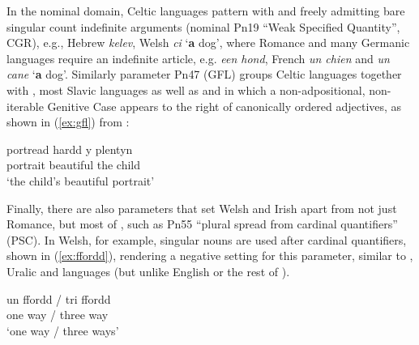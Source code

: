 \documentclass[output=paper,colorlinks,citecolor=brown]{langscibook}
\begin{document}
In the nominal domain, Celtic languages pattern with  and  freely admitting bare singular count indefinite arguments (nominal Pn19 ``Weak Specified Quantity'', CGR), e.g., Hebrew \textit{kelev}, Welsh \textit{ci} `\textbf{a} dog', where Romance and many Germanic languages require an indefinite article, e.g.   \textit{een hond}, French \textit{un chien} and  \textit{un cane} `\textbf{a} dog'. Similarly parameter Pn47 (GFL) groups Celtic languages together with , most Slavic languages as well as  and  in which a non-adpositional, non-iterable Genitive Case appears to the right of canonically ordered adjectives, as shown in (\ref{ex:gfl}) from  \citet[31]{mm:ceolin_at_2021}:

\ea
\settowidth{}
\gll portread hardd y plentyn\\
portrait beautiful the child\\ 
\glt `the child's beautiful portrait' 
\label{ex:gfl}
\z 

\noindent Finally, there are also parameters that set Welsh and Irish apart from not just Romance, but most of , such as Pn55 ``plural spread from cardinal quantifiers'' (PSC). In Welsh, for example, singular nouns are used after cardinal quantifiers, shown in (\ref{ex:ffordd}), rendering a negative setting for this parameter, similar to , Uralic and  languages (but unlike English or the rest of ).

\ea
\settowidth{}
\gll un ffordd / tri ffordd\\
one way / three way \\
\glt `one way / three ways' 
\label{ex:ffordd}
\z 
\end{document}
